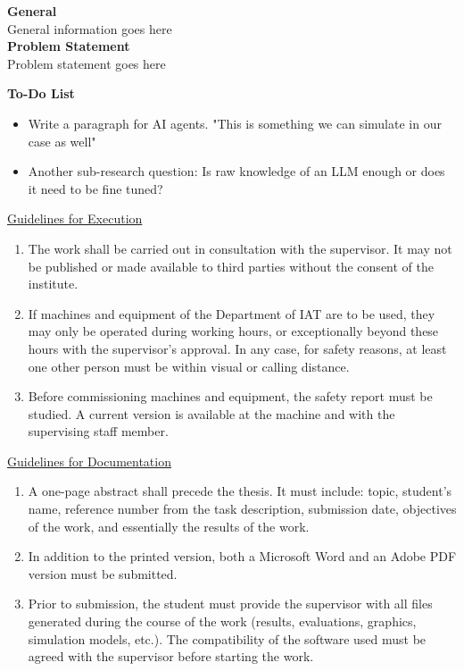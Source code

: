 \begin{aufgabenstellung}

\textbf{General}\\
General information goes here \\

\textbf{Problem Statement}\\
Problem statement goes here

\textbf{To-Do List}
\begin{itemize}
    \item Write a paragraph for AI agents. "This is something we can simulate in our case as well"
    \item Another sub-research question: Is raw knowledge of an LLM enough or does it need to be fine tuned?
\end{itemize}

\newpage
\underline{Guidelines for Execution}\\
\begin{enumerate}
\item The work shall be carried out in consultation with the supervisor. It may not be published or made available to third parties without the consent of the institute.
\item If machines and equipment of the Department of IAT are to be used, they may only be operated during working hours, or exceptionally beyond these hours with the supervisor’s approval. In any case, for safety reasons, at least one other person must be within visual or calling distance.
\item Before commissioning machines and equipment, the safety report must be studied. A current version is available at the machine and with the supervising staff member.
\end{enumerate}

\underline{Guidelines for Documentation} \\
\begin{enumerate}
\item A one-page abstract shall precede the thesis. It must include: topic, student’s name, reference number from the task description, submission date, objectives of the work, and essentially the results of the work.
\item In addition to the printed version, both a Microsoft Word and an Adobe PDF version must be submitted.
\item Prior to submission, the student must provide the supervisor with all files generated during the course of the work (results, evaluations, graphics, simulation models, etc.). The compatibility of the software used must be agreed with the supervisor before starting the work.
\end{enumerate}


\end{aufgabenstellung}
